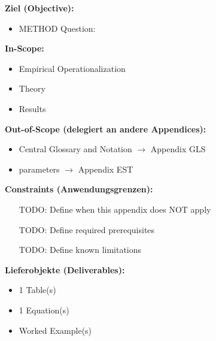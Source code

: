 

\begin{tcolorbox}[
    colback=orange!5!white,
    colframe=orange!75!black,
    title={\textbf{Appendix Scope: Ziel / In-Scope / Out-of-Scope / Constraints}},
    fonttitle=\bfseries
]

\textbf{Ziel (Objective):}
\begin{itemize}[nosep]
    \item METHOD Question:
\end{itemize}

\textbf{In-Scope:}
\begin{itemize}[nosep]
    \item Empirical Operationalization
    \item Theory
    \item Results
\end{itemize}

\textbf{Out-of-Scope (delegiert an andere Appendices):}
\begin{itemize}[nosep]
    \item Central Glossary and Notation $\rightarrow$ Appendix GLS
    \item parameters $\rightarrow$ Appendix EST
\end{itemize}

\textbf{Constraints (Anwendungsgrenzen):}
\begin{itemize}[nosep]
    \item [TODO: Define when this appendix does NOT apply]
    \item [TODO: Define required prerequisites]
    \item [TODO: Define known limitations]
\end{itemize}

\textbf{Lieferobjekte (Deliverables):}
\begin{itemize}[nosep]
    \item 1 Table(s)
    \item 1 Equation(s)
    \item Worked Example(s)
\end{itemize}

\end{tcolorbox}


